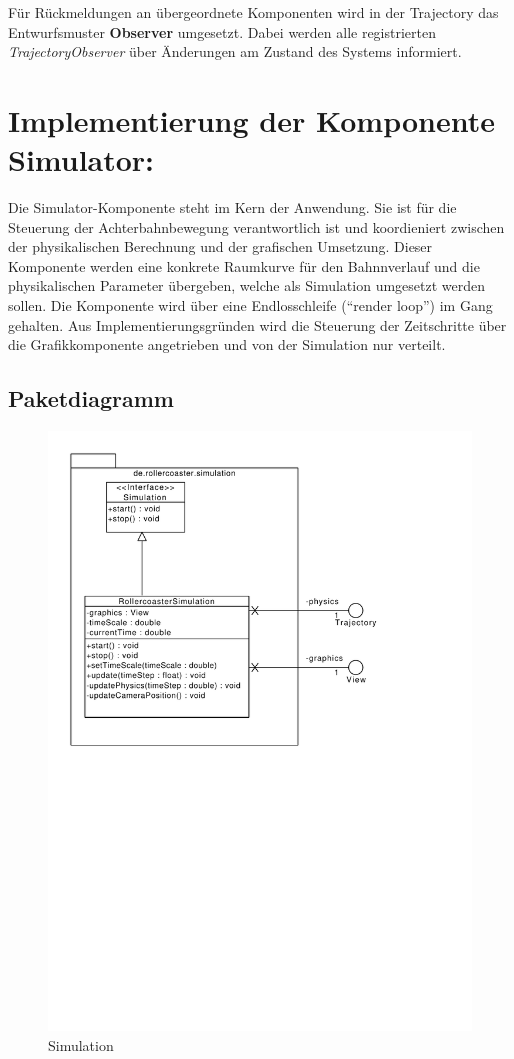 Für Rückmeldungen an übergeordnete Komponenten wird in der Trajectory das Entwurfsmuster
\textbf{Observer} umgesetzt. Dabei werden alle registrierten \emph{TrajectoryObserver}
über Änderungen am Zustand des Systems informiert.

\section{Implementierung der Komponente Simulator:}

Die Simulator-Komponente steht im Kern der Anwendung. Sie ist für die Steuerung der
Achterbahnbewegung verantwortlich ist und koordieniert zwischen der physikalischen 
Berechnung und der grafischen Umsetzung. Dieser Komponente werden eine konkrete 
Raumkurve für den Bahnnverlauf und die physikalischen Parameter übergeben, welche
als Simulation umgesetzt werden sollen. Die Komponente wird über eine 
Endlosschleife (``render loop'') im Gang gehalten. Aus Implementierungsgründen wird
die Steuerung der Zeitschritte über die Grafikkomponente angetrieben und von der
Simulation nur verteilt.

\subsection{Paketdiagramm}
\begin{figure}
\includegraphics[width=\linewidth]{bilder/Simulation}
\caption{Simulation}
\end{figure}

